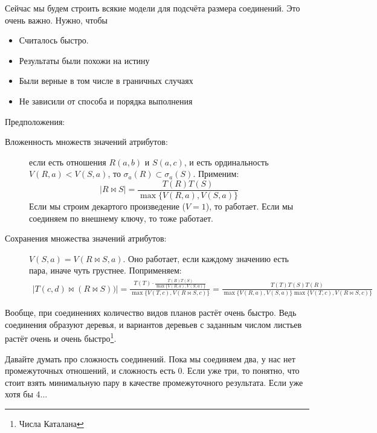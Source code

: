 Сейчас мы будем строить всякие модели для подсчёта размера соединений.
Это очень важно. Нужно, чтобы
\begin{itemize}
\item Считалось быстро.
\item Результаты были похожи на истину
\item Были верные в том числе в граничных случаях
\item Не зависили от способа и порядка выполнения
\end{itemize}

Предположения:
\begin{description}
\item[Вложенность множеств значений атрибутов:]
	если есть отношения $R(a, b)$ и $S(a, c)$, и есть ординальность $V(R, a) < V(S, a)$, то $\sigma_a(R) \subset \sigma_a(S)$.
	Применим:
	\[ |R \bowtie S| = \frac{T(R) T(S)}{\max\{V(R, a), V(S, a)\}} \]
	Если мы строим декартого произведение ($V = 1$), то работает.
	Если мы соединяем по внешнему ключу, то тоже работает.

\item[Сохранения множества значений атрибутов:]
	$V(S, a) = V(R \bowtie S, a)$.
	Оно работает, если каждому значению есть пара, иначе чуть грустнее.
	Поприменяем:
	\begin{gather*}
		| T(c, d) \bowtie (R \bowtie S)) |
		= \frac{T(T) \cdot \frac{T(R) T(S)}{\max\{V(R, a), V(S, a)\}}}{\max\{V(T, c), V(R \bowtie S, c)\}}
		= \frac{T(T) T(S) T(R)}{\max\{V(R, a), V(S, a)\}\max\{V(T, c), V(R \bowtie S, c)\}}
	\end{gather*}
\end{description}

Вообще, при соединениях количество видов планов растёт очень быстро.
Ведь соединения образуют деревья, и вариантов деревьев с заданным числом листьев растёт очень и очень быстро\footnote{Числа Каталана}.	

Давайте думать про сложность соединений.
Пока мы соединяем два, у нас нет промежуточных отношений, и сложность есть 0.
Если уже три, то понятно, что стоит взять минимальную пару в качестве промежуточного результата.
Если уже хотя бы 4...

